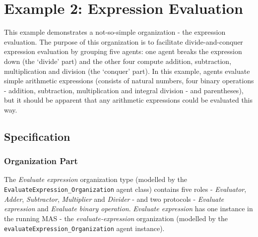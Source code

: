 
\section{Example 2: Expression Evaluation}

This example demonstrates a not-so-simple organization - the expression evaluation.
The purpose of this organization is to facilitate divide-and-conquer expression evaluation by grouping five agents: one agent breaks the expression down (the `divide' part) and the other four compute addition, subtraction, multiplication and division (the `conquer' part).
In this example, agents evaluate simple arithmetic expressions (consists of natural numbers, four binary operations - addition, subtraction, multiplication and integral division - and parentheses), but it should be apparent that any arithmetic expressions could be evaluated this way.

\subsection*{Specification}

\subsubsection*{Organization Part}

The \textit{Evaluate expression} organization type (modelled by the \texttt{EvaluateExpression\_Organization} agent class) contains five roles - \textit{Evaluator}, \textit{Adder}, \textit{Subtractor}, \textit{Multiplier} and \textit{Divider} - and two protocols - \textit{Evaluate expression} and \textit{Evaluate binary operation}.
\textit{Evaluate expression} has one instance in the running MAS - the \textit{evaluate-expression} organization (modelled by the \texttt{evaluateExpression\_Organization} agent instance).

